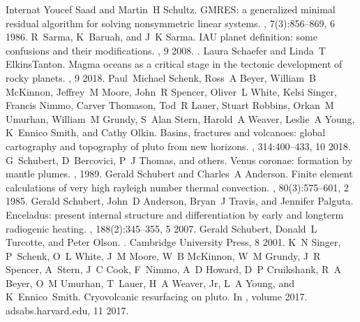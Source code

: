 \documentclass[letterpaper,10pt,english]{jupyterBook}
\begin{document}
\begin{sphinxthebibliography}{Internat}
\sphinxAtStartPar
Youcef Saad and Martin H Schultz. GMRES: a generalized minimal residual algorithm for solving nonsymmetric linear systems. , 7(3):856–869, 6 1986.
\sphinxAtStartPar
R Sarma, K Baruah, and J K Sarma. IAU planet definition: some confusions and their modifications. , 9 2008. .
\sphinxAtStartPar
Laura Schaefer and Linda T Elkins\sphinxhyphen{}Tanton. Magma oceans as a critical stage in the tectonic development of rocky planets. , 9 2018.
\sphinxAtStartPar
Paul Michael Schenk, Ross A Beyer, William B McKinnon, Jeffrey M Moore, John R Spencer, Oliver L White, Kelsi Singer, Francis Nimmo, Carver Thomason, Tod R Lauer, Stuart Robbins, Orkan M Umurhan, William M Grundy, S Alan Stern, Harold A Weaver, Leslie A Young, K Ennico Smith, and Cathy Olkin. Basins, fractures and volcanoes: global cartography and topography of pluto from new horizons. , 314:400–433, 10 2018.
\sphinxAtStartPar
G Schubert, D Bercovici, P J Thomas, and others. Venus coronae: formation by mantle plumes. , 1989.
\sphinxAtStartPar
Gerald Schubert and Charles A Anderson. Finite element calculations of very high rayleigh number thermal convection. , 80(3):575–601, 2 1985.
\sphinxAtStartPar
Gerald Schubert, John D Anderson, Bryan J Travis, and Jennifer Palguta. Enceladus: present internal structure and differentiation by early and long\sphinxhyphen{}term radiogenic heating. , 188(2):345–355, 5 2007.
\sphinxAtStartPar
Gerald Schubert, Donald L Turcotte, and Peter Olson. . Cambridge University Press, 8 2001.
\sphinxAtStartPar
K N Singer, P Schenk, O L White, J M Moore, W B McKinnon, W M Grundy, J R Spencer, A Stern, J C Cook, F Nimmo, A D Howard, D P Cruikshank, R A Beyer, O M Umurhan, T Lauer, H A Weaver, Jr, L A Young, and K Ennico Smith. Cryovolcanic resurfacing on pluto. In , volume 2017. adsabs.harvard.edu, 11 2017.

\end{sphinxthebibliography}
\end{document}
